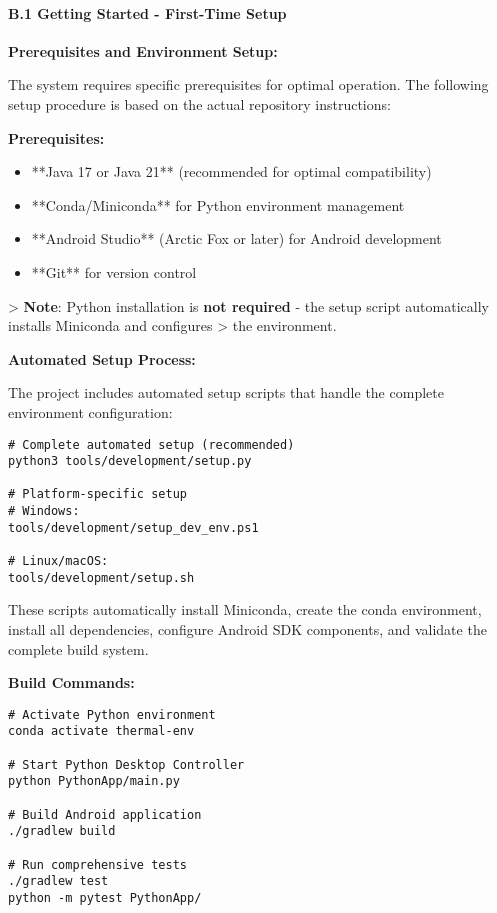 \documentclass[12pt,a4paper]{article}
\begin{document}
\paragraph{B.1 Getting Started - First-Time Setup}

\textbf{Prerequisites and Environment Setup:}

The system requires specific prerequisites for optimal operation. The following setup procedure is based on the actual
repository instructions:

\textbf{Prerequisites:}

\begin{itemize}
\item **Java 17 or Java 21** (recommended for optimal compatibility)
\item **Conda/Miniconda** for Python environment management
\item **Android Studio** (Arctic Fox or later) for Android development
\item **Git** for version control

\end{itemize}
> \textbf{Note}: Python installation is \textbf{not required} - the setup script automatically installs Miniconda and configures
> the environment.

\textbf{Automated Setup Process:}

The project includes automated setup scripts that handle the complete environment configuration:

\begin{verbatim}
# Complete automated setup (recommended)
python3 tools/development/setup.py

# Platform-specific setup
# Windows:
tools/development/setup_dev_env.ps1

# Linux/macOS:
tools/development/setup.sh
\end{verbatim}

These scripts automatically install Miniconda, create the conda environment, install all dependencies, configure Android
SDK components, and validate the complete build system.

\textbf{Build Commands:}

\begin{verbatim}
# Activate Python environment
conda activate thermal-env

# Start Python Desktop Controller
python PythonApp/main.py

# Build Android application
./gradlew build

# Run comprehensive tests
./gradlew test
python -m pytest PythonApp/
\end{verbatim}
\end{document}
